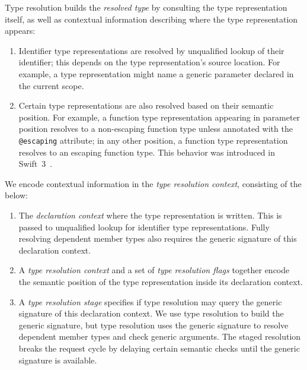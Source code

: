 \documentclass[../generics]{subfiles}
\begin{document}
Type resolution builds the \emph{resolved type} by consulting the type representation itself, as well as contextual information describing where the type representation appears:
\begin{enumerate}
\item Identifier type representations are resolved by unqualified lookup of their identifier; this depends on the type representation's source location. For example, a type representation might name a generic parameter declared in the current scope.
\item Certain type representations are also resolved based on their semantic position. For example, a function type representation appearing in parameter position resolves to a non-escaping function type unless annotated with the \texttt{@escaping} attribute; in any other position, a function type representation resolves to an escaping function type. This behavior was introduced in Swift~3~\cite{se0103}.
\end{enumerate}
We encode contextual information in the \emph{type resolution context}, consisting of the below:
\begin{enumerate}
\item The \emph{declaration context} where the type representation is written. This is passed to unqualified lookup for identifier type representations. Fully resolving dependent member types also requires the generic signature of this declaration context.
\item A \emph{type resolution context} and a set of \emph{type resolution flags} together encode the semantic position of the type representation inside its declaration context.
\item A \emph{type resolution stage} specifies if type resolution may query the generic signature of this declaration context. We use type resolution to build the generic signature, but type resolution uses the generic signature to resolve dependent member types and check generic arguments. The staged resolution breaks the request cycle by delaying certain semantic checks until the generic signature is available.
\end{enumerate}
\end{document}
